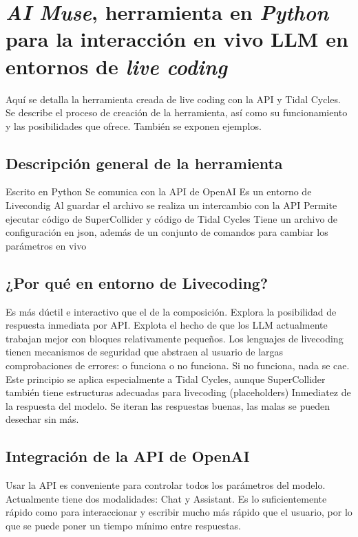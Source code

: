 \chapter{\emph{AI Muse}, herramienta en \emph{Python} para la interacción en vivo LLM en entornos de \emph{live coding}}
\label{chap:ai_muse}


Aquí se detalla la herramienta creada de live coding con la API y Tidal Cycles. Se describe el proceso de creación de la herramienta, así como su funcionamiento y las posibilidades que ofrece. También se exponen ejemplos.

\section{Descripción general de la herramienta}

Escrito en Python
Se comunica con la API de OpenAI
Es un entorno de Livecondig
Al guardar el archivo se realiza un intercambio con la API
Permite ejecutar código de SuperCollider y código de Tidal Cycles
Tiene un archivo de configuración en json, además de un conjunto de comandos para cambiar los parámetros en vivo

\section{¿Por qué en entorno de Livecoding?}

Es más dúctil e interactivo que el de la composición.
Explora la posibilidad de respuesta inmediata por API.
Explota el hecho de que los LLM actualmente trabajan mejor con bloques relativamente pequeños.
Los lenguajes de livecoding tienen mecanismos de seguridad que abstraen al usuario de largas comprobaciones de errores: o funciona o no funciona. Si no funciona, nada se cae. Este principio se aplica especialmente a Tidal Cycles, aunque SuperCollider también tiene estructuras adecuadas para livecoding (placeholders)
Inmediatez de la respuesta del modelo. Se iteran las respuestas buenas, las malas se pueden desechar sin más.

\section{Integración de la API de OpenAI}

Usar la API es conveniente para controlar todos los parámetros del modelo.
Actualmente tiene dos modalidades: Chat y Assistant.
Es lo suficientemente rápido como para interaccionar y escribir mucho más rápido que el usuario, por lo que se puede poner un tiempo mínimo entre respuestas.



